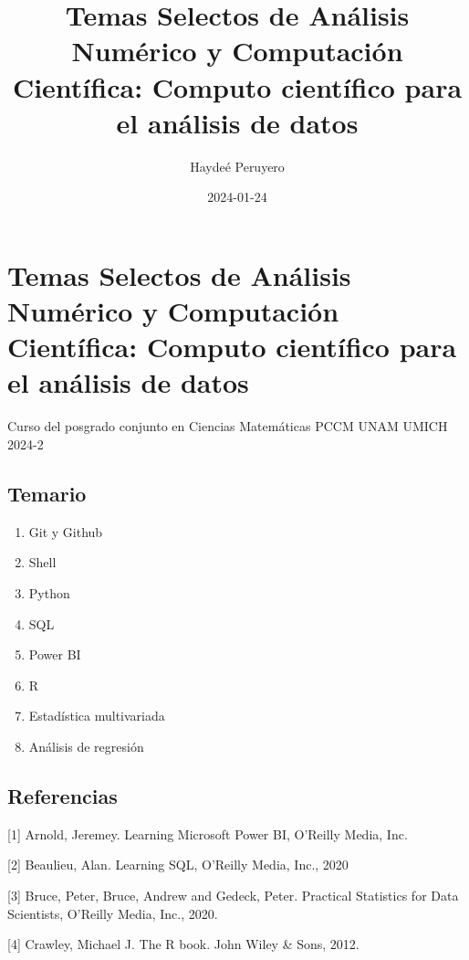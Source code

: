 \documentclass[
]{book}
\title{Temas Selectos de Análisis Numérico y Computación Científica: Computo científico para el análisis de datos}
\author{Haydeé Peruyero}
\date{2024-01-24}
\begin{document}
\maketitle

{
\setcounter{tocdepth}{1}
\tableofcontents
}
\hypertarget{temas-selectos-de-anuxe1lisis-numuxe9rico-y-computaciuxf3n-cientuxedfica-computo-cientuxedfico-para-el-anuxe1lisis-de-datos}{%
\chapter{Temas Selectos de Análisis Numérico y Computación Científica: Computo científico para el análisis de datos}\label{temas-selectos-de-anuxe1lisis-numuxe9rico-y-computaciuxf3n-cientuxedfica-computo-cientuxedfico-para-el-anuxe1lisis-de-datos}}

Curso del posgrado conjunto en Ciencias Matemáticas PCCM UNAM UMICH 2024-2

\hypertarget{temario}{%
\section{Temario}\label{temario}}

\begin{enumerate}
\def\labelenumi{\arabic{enumi}.}
\item
  Git y Github
\item
  Shell
\item
  Python
\item
  SQL
\item
  Power BI
\item
  R
\item
  Estadística multivariada
\item
  Análisis de regresión
\end{enumerate}

\hypertarget{referencias}{%
\section{Referencias}\label{referencias}}

{[}1{]} Arnold, Jeremey. Learning Microsoft Power BI, O'Reilly Media, Inc.

{[}2{]} Beaulieu, Alan. Learning SQL, O'Reilly Media, Inc., 2020

{[}3{]} Bruce, Peter, Bruce, Andrew and Gedeck, Peter. Practical Statistics for Data Scientists, O'Reilly Media, Inc., 2020.

{[}4{]} Crawley, Michael J. The R book. John Wiley \& Sons, 2012.
\end{document}
